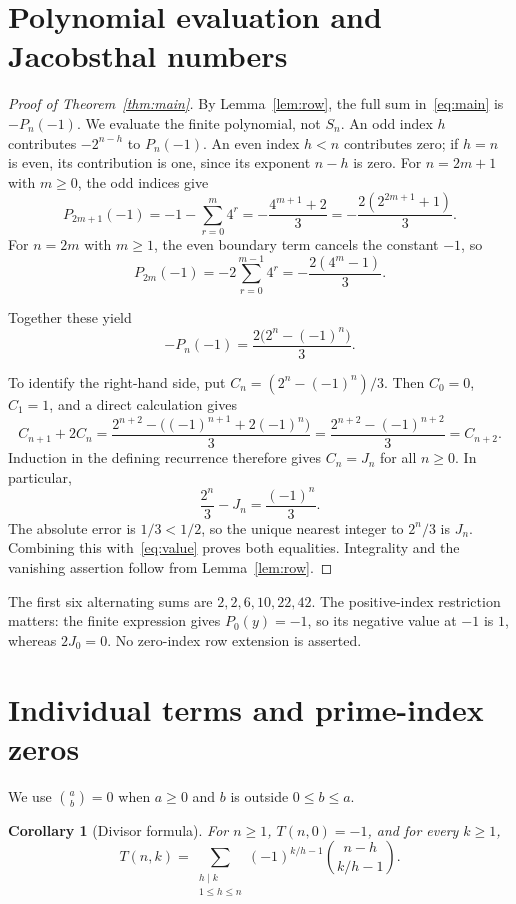 \documentclass[11pt]{article}
\newtheorem{corollary}{Corollary}
\begin{document}
\section{Polynomial evaluation and Jacobsthal numbers}

\begin{proof}[Proof of Theorem~\ref{thm:main}]
By Lemma~\ref{lem:row}, the full sum in~\eqref{eq:main} is $-P_n(-1)$.
We evaluate the finite polynomial, not $S_n$.
An odd index $h$ contributes $-2^{n-h}$ to $P_n(-1)$.
An even index $h<n$ contributes zero; if $h=n$ is even, its contribution
is one, since its exponent $n-h$ is zero.
For $n=2m+1$ with $m\geq0$, the odd indices give
\[
 P_{2m+1}(-1)=-1-\sum_{r=0}^{m}4^r
 =-\frac{4^{m+1}+2}{3}
 =-\frac{2(2^{2m+1}+1)}{3}.
\]
For $n=2m$ with $m\geq1$, the even boundary term cancels the constant
$-1$, so
\[
 P_{2m}(-1)=-2\sum_{r=0}^{m-1}4^r
 =-\frac{2(4^m-1)}{3}.
\]
\par\nopagebreak
Together these yield
\begin{equation}\label{eq:value}
 -P_n(-1)=\frac{2\bigl(2^n-(-1)^n\bigr)}{3}.
\end{equation}

To identify the right-hand side, put $C_n=(2^n-(-1)^n)/3$.
Then $C_0=0$, $C_1=1$, and a direct calculation gives
\[
 C_{n+1}+2C_n
 =\frac{2^{n+2}-\bigl((-1)^{n+1}+2(-1)^n\bigr)}{3}
 =\frac{2^{n+2}-(-1)^{n+2}}{3}=C_{n+2}.
\]
Induction in the defining recurrence therefore gives $C_n=J_n$ for all
$n\geq0$. In particular,
\[
 \frac{2^n}{3}-J_n=\frac{(-1)^n}{3}.
\]
The absolute error is $1/3<1/2$, so the unique nearest integer to $2^n/3$
is $J_n$. Combining this with~\eqref{eq:value} proves both equalities.
Integrality and the vanishing assertion follow from Lemma~\ref{lem:row}.
\end{proof}

The first six alternating sums are $2,2,6,10,22,42$.
The positive-index restriction matters: the finite expression gives
$P_0(y)=-1$, so its negative value at $-1$ is $1$, whereas $2J_0=0$.
No zero-index row extension is asserted.

\section{Individual terms and prime-index zeros}

We use $\binom{a}{b}=0$ when $a\geq0$ and $b$ is outside $0\leq b\leq a$.

\begin{corollary}[Divisor formula]\label{cor:divisors}
For $n\geq1$, $T(n,0)=-1$, and for every $k\geq1$,
\begin{equation}\label{eq:divisors}
 T(n,k)=\sum_{\substack{h\mid k\\1\leq h\leq n}}
 (-1)^{k/h-1}\binom{n-h}{k/h-1}.
\end{equation}
\end{corollary}
\end{document}
